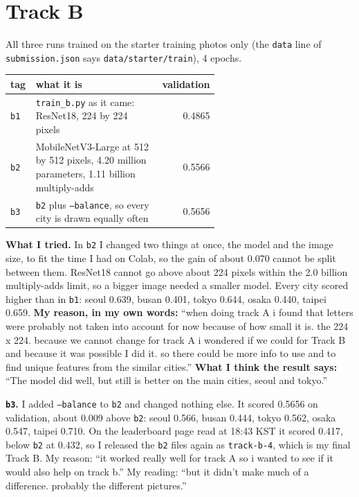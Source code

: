 \documentclass[11pt]{article}
\begin{document}
\section*{Track B}

All three runs trained on the starter training photos only (the \texttt{data}
line of \texttt{submission.json} says \texttt{data/starter/train}), 4 epochs.

\begin{center}\footnotesize
\begin{tabular}{lp{0.6\linewidth}r}
\toprule
tag & what it is & validation \\
\midrule
\texttt{b1} & \texttt{train\_b.py} as it came: ResNet18, 224 by 224 pixels & 0.4865 \\
\texttt{b2} & MobileNetV3-Large at 512 by 512 pixels, 4.20 million parameters, 1.11 billion multiply-adds & 0.5566 \\
\texttt{b3} & \texttt{b2} plus \texttt{--balance}, so every city is drawn equally often & 0.5656 \\
\bottomrule
\end{tabular}
\end{center}

\textbf{What I tried.} In \texttt{b2} I changed two things at once, the model
and the image size, to fit the time I had on Colab, so the gain of about 0.070
cannot be split between them. ResNet18 cannot go above about 224 pixels within
the 2.0 billion multiply-adds limit, so a bigger image needed a smaller model.
Every city scored higher than in \texttt{b1}: seoul 0.639, busan 0.401, tokyo
0.644, osaka 0.440, taipei 0.659.
\textbf{My reason, in my own words:} ``when doing track A i found that letters
were probably not taken into account for now because of how small it is. the
224 x 224. because we cannot change for track A i wondered if we could for
Track B and because it was possible I did it. so there could be more info to
use and to find unique features from the similar cities.'' \textbf{What I
think the result says:} ``The model did well, but still is better on the main
cities, seoul and tokyo.''

\textbf{\texttt{b3}.} I added \texttt{--balance} to \texttt{b2} and changed
nothing else. It scored 0.5656 on validation, about 0.009 above \texttt{b2}:
seoul 0.566, busan 0.444, tokyo 0.562, osaka 0.547, taipei 0.710. On the
leaderboard page read at 18:43 KST it scored 0.417, below \texttt{b2} at 0.432,
so I released the \texttt{b2} files again as \texttt{track-b-4}, which is my
final Track B. My reason: ``it worked really well for track A so i wanted to
see if it would also help on track b.'' My reading: ``but it didn't make much
of a difference. probably the different pictures.''
\end{document}
